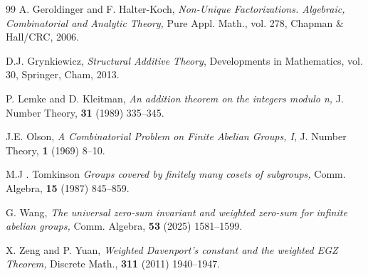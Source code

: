 \documentclass[a4paper, 12pt]{article}
\begin{document}
\begin{thebibliography}{99}
 A. Geroldinger and F. Halter-Koch, \emph{Non-Unique
Factorizations. Algebraic, Combinatorial and Analytic Theory,}
Pure Appl. Math., vol. 278, Chapman $\&$ Hall/CRC,
2006.




 D.J. Grynkiewicz, \emph{Structural Additive Theory}, Developments in Mathematics, vol. 30, Springer, Cham, 2013.




 P. Lemke and D. Kleitman, \emph{An addition theorem on the integers modulo n,} J. Number Theory, \textbf{31} (1989) 335--345.






 J.E. Olson,  \emph{A Combinatorial Problem on Finite Abelian Groups, I}, J. Number Theory, \textbf{1} (1969) 8--10.















 M.J . Tomkinson \emph{Groups covered by finitely many cosets of subgroups,} Comm. Algebra,  \textbf{15} (1987) 845--859.

    G. Wang, \emph{The universal zero-sum invariant and weighted zero-sum for infinite abelian groups,} Comm. Algebra,  \textbf{53} (2025) 1581--1599.


  X. Zeng and P. Yuan, \emph{Weighted Davenport's constant and the weighted EGZ Theorem,} Discrete Math., \textbf{311} (2011) 1940--1947.



\end{thebibliography}
\end{document}
